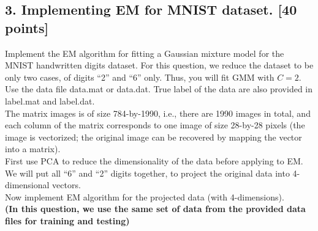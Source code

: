 \documentclass[12pt]{article}
\begin{document}
\subsection*{3. Implementing EM for MNIST dataset. [40 points]}

Implement the EM algorithm for fitting a Gaussian mixture model for the MNIST handwritten digits dataset. For this question, we reduce the dataset to be only two cases, of digits ``2'' and ``6'' only. Thus, you will fit GMM with $C = 2$. Use the data file \textsf{data.mat} or \textsf{data.dat}. True label of the data are also provided in \textsf{label.mat} and \textsf{label.dat}.
\\

The matrix \textsf{images} is of size 784-by-1990, i.e., there are 1990 images in total, and each column of the matrix corresponds to one image of size 28-by-28 pixels (the image is vectorized; the original image can be recovered by mapping the vector into a matrix).  \\

First use PCA to reduce the dimensionality of the data before applying to EM. We will put all ``6'' and ``2'' digits together, to project the original data into 4-dimensional vectors. \\

Now implement EM algorithm for the projected data (with 4-dimensions). \\
\textbf{(In this question, we use the same set of data from the provided data files for training and testing)}
\end{document}
